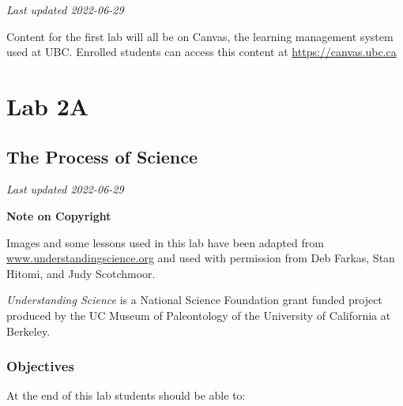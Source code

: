 \documentclass[
]{book}
\begin{document}
\emph{Last updated 2022-06-29}

Content for the first lab will all be on Canvas, the learning management system used at UBC. Enrolled students can access this content at \url{https://canvas.ubc.ca}

\hypertarget{part-lab-2a}{%
\part*{Lab 2A}\label{part-lab-2a}}

\hypertarget{the-process-of-science}{%
\chapter*{The Process of Science}\label{the-process-of-science}}

\emph{Last updated 2022-06-29}

\textbf{Note on Copyright}

Images and some lessons used in this lab have been adapted from \href{http://www.understandingscience.org/}{www.understandingscience.org} and used with permission from Deb Farkas, Stan Hitomi, and Judy Scotchmoor.

\emph{Understanding Science} is a National Science Foundation grant funded project produced by the UC Museum of Paleontology of the University of California at Berkeley.

\hypertarget{objectives}{%
\section*{Objectives}\label{objectives}}

At the end of this lab students should be able to:
\end{document}

